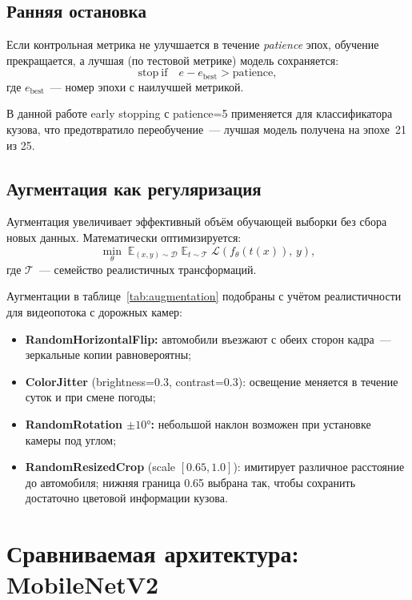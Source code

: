 \documentclass[14pt,a4paper]{report}
\numberwithin{equation}{chapter}
\numberwithin{figure}{chapter}
\numberwithin{table}{chapter}
\begin{document}
\subsection{Ранняя остановка}

Если контрольная метрика не улучшается в течение
\textit{patience} эпох, обучение прекращается, а лучшая
(по тестовой метрике) модель сохраняется:
\begin{equation}
  \mathrm{stop~if}\quad
  e - e_{\mathrm{best}} > \mathrm{patience},
\end{equation}
где $e_{\mathrm{best}}$~--- номер эпохи с наилучшей метрикой.

В данной работе early stopping с patience=5 применяется
для классификатора кузова, что предотвратило переобучение~---
лучшая модель получена на эпохе~21 из 25.

\subsection{Аугментация как регуляризация}

Аугментация увеличивает эффективный объём обучающей выборки
без сбора новых данных. Математически оптимизируется:
\begin{equation}
  \min_\theta\;
  \mathbb{E}_{(x,y)\sim\mathcal{D}}\;
  \mathbb{E}_{t\sim\mathcal{T}}\;
  \mathcal{L}(f_\theta(t(x)),\, y),
\end{equation}
где $\mathcal{T}$~--- семейство реалистичных трансформаций.

Аугментации в таблице~\ref{tab:augmentation} подобраны
с учётом реалистичности для видеопотока с дорожных камер:
\begin{itemize}[nosep]
  \item \textbf{RandomHorizontalFlip:} автомобили въезжают
    с обеих сторон кадра~--- зеркальные копии равновероятны;
  \item \textbf{ColorJitter} (brightness=0.3, contrast=0.3):
    освещение меняется в течение суток и при смене погоды;
  \item \textbf{RandomRotation $\pm10°$:} небольшой наклон
    возможен при установке камеры под углом;
  \item \textbf{RandomResizedCrop} (scale $[0.65, 1.0]$):
    имитирует различное расстояние до автомобиля;
    нижняя граница 0.65 выбрана так, чтобы сохранить
    достаточно цветовой информации кузова.
\end{itemize}

\section{Сравниваемая архитектура: MobileNetV2}
\end{document}
